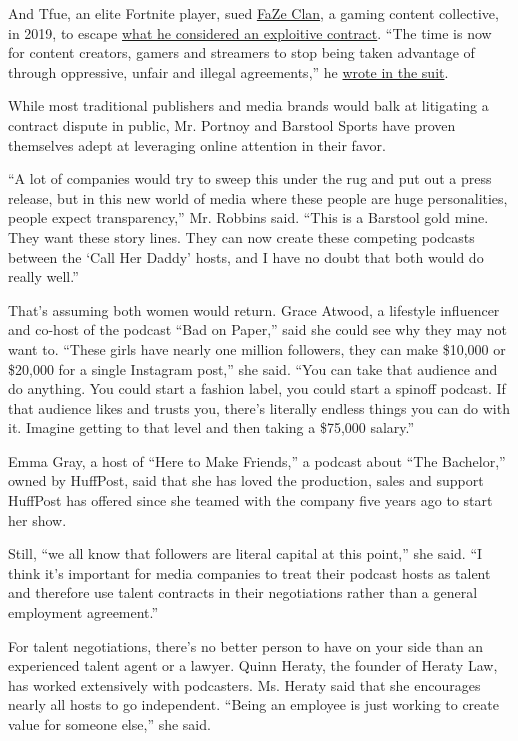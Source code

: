 And Tfue, an elite Fortnite player, sued
\href{https://www.nytimes3xbfgragh.onion/2019/11/15/style/faze-clan-house.html}{FaZe
Clan}, a gaming content collective, in 2019, to escape
\href{https://www.theatlantic.com/technology/archive/2019/05/why-tfues-lawsuit-against-faze-clan-matters/589900/}{what
he considered an exploitive contract}. ``The time is now for content
creators, gamers and streamers to stop being taken advantage of through
oppressive, unfair and illegal agreements,'' he
\href{https://www.theatlantic.com/technology/archive/2019/05/why-tfues-lawsuit-against-faze-clan-matters/589900/}{wrote
in the suit}.

While most traditional publishers and media brands would balk at
litigating a contract dispute in public, Mr. Portnoy and Barstool Sports
have proven themselves adept at leveraging online attention in their
favor.

``A lot of companies would try to sweep this under the rug and put out a
press release, but in this new world of media where these people are
huge personalities, people expect transparency,'' Mr. Robbins said.
``This is a Barstool gold mine. They want these story lines. They can
now create these competing podcasts between the `Call Her Daddy' hosts,
and I have no doubt that both would do really well.''

That's assuming both women would return. Grace Atwood, a lifestyle
influencer and co-host of the podcast ``Bad on Paper,'' said she could
see why they may not want to. ``These girls have nearly one million
followers, they can make \$10,000 or \$20,000 for a single Instagram
post,'' she said. ``You can take that audience and do anything. You
could start a fashion label, you could start a spinoff podcast. If that
audience likes and trusts you, there's literally endless things you can
do with it. Imagine getting to that level and then taking a \$75,000
salary.''

Emma Gray, a host of ``Here to Make Friends,'' a podcast about ``The
Bachelor,'' owned by HuffPost, said that she has loved the production,
sales and support HuffPost has offered since she teamed with the company
five years ago to start her show.

Still, ``we all know that followers are literal capital at this point,''
she said. ``I think it's important for media companies to treat their
podcast hosts as talent and therefore use talent contracts in their
negotiations rather than a general employment agreement.''

For talent negotiations, there's no better person to have on your side
than an experienced talent agent or a lawyer. Quinn Heraty, the founder
of Heraty Law, has worked extensively with podcasters. Ms. Heraty said
that she encourages nearly all hosts to go independent. ``Being an
employee is just working to create value for someone else,'' she said.

